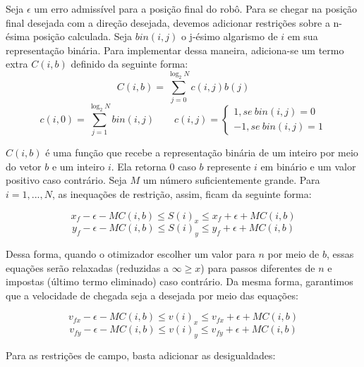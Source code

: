 \documentclass[a4paper,12pt]{article}
\begin{document}
Seja $\epsilon$ um erro admissível para a posição final do robô. Para se chegar na posição final desejada com a direção desejada, devemos adicionar restrições sobre a n-ésima posição calculada. Seja $bin(i,j)$ o j-ésimo algarismo de $i$ em sua representação binária. Para implementar dessa maneira, adiciona-se um termo extra $C(i,b)$ definido da seguinte forma:
\begin{equation}
    C(i,b) = \sum_{j=0}^{\log_2{N}} c(i,j)b(j)
\end{equation}
\begin{equation}
    c(i,0) = \sum_{j=1}^{\log_2 {N}} bin(i,j) \qquad
    c(i,j) = \left\{ \begin{array}{r} 1, se\ bin(i,j) = 0 \\ 
    -1, se\ bin(i,j) = 1
    \end{array} \right.
\end{equation}

$C(i,b)$ é uma função que recebe a representação binária de um inteiro por meio do vetor $b$ e um inteiro $i$. Ela retorna 0 caso $b$ represente $i$ em binário e um valor positivo caso contrário. Seja $M$ um número suficientemente grande. Para $i = 1,...,N$, as inequações de restrição, assim, ficam da seguinte forma:

\begin{equation}
	x_{f} - \epsilon - MC(i,b) \leq S(i)_x \leq x_{f} + \epsilon + MC(i,b)
\end{equation}
\begin{equation}
	y_{f} - \epsilon - MC(i,b) \leq S(i)_y \leq y_{f} + \epsilon + MC(i,b)
\end{equation}

Dessa forma, quando o otimizador escolher um valor para $n$ por meio de $b$, essas equações serão relaxadas (reduzidas a $\infty \geq x$) para passos diferentes de $n$ e impostas (último termo eliminado) caso contrário. Da mesma forma, garantimos que a velocidade de chegada seja a desejada por meio das equações:

\begin{equation}
	v_{fx} - \epsilon - MC(i,b) \leq v(i)_x \leq v_{fx} + \epsilon + MC(i,b)
\end{equation}
\begin{equation}
	v_{fy} - \epsilon - MC(i,b) \leq v(i)_y \leq v_{fy} + \epsilon + MC(i,b)
\end{equation}

Para as restrições de campo, basta adicionar as desigualdades:
\end{document}
